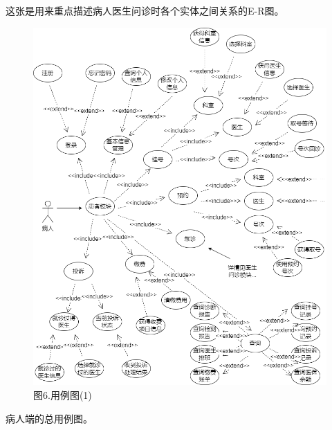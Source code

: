 \documentclass[24pt,a4paper]{article}%
\begin{document}
这张是用来重点描述病人医生问诊时各个实体之间关系的E-R图。
\begin{figure}[H]
    \centering
    \includegraphics[width=1\textwidth]{image/用例图(1).png}
    \caption*{图6.用例图(1)}
\end{figure}
病人端的总用例图。
\end{document}
